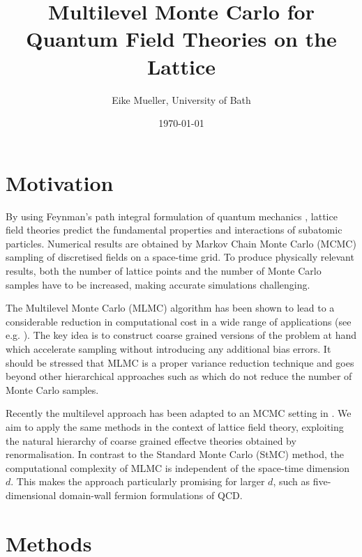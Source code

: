 \documentclass[11pt]{article}
\author{Eike Mueller, University of Bath}
\date{\today}
\title{Multilevel Monte Carlo for Quantum Field Theories on the Lattice}
\begin{document}
\maketitle
\section{Motivation}
By using Feynman's path integral formulation of quantum mechanics \cite{Feynman2010}, lattice field theories predict the fundamental properties and interactions of subatomic particles. Numerical results are obtained by Markov Chain Monte Carlo (MCMC) sampling of discretised fields on a space-time grid. To produce physically relevant results, both the number of lattice points and the number of Monte Carlo samples have to be increased, making accurate simulations challenging.

The Multilevel Monte Carlo (MLMC) algorithm \cite{Heinrich2001,Giles2008,Giles2015} has been shown to lead to a considerable reduction in computational cost in a wide range of applications (see e.g. \cite{Katsiolides2017}). The key idea is to construct coarse grained versions of the problem at hand which accelerate sampling without introducing any additional bias errors. It should be stressed that MLMC is a proper variance reduction technique and goes beyond other hierarchical approaches such as \cite{Faas1986} which do not reduce the number of Monte Carlo samples.

Recently the multilevel approach has been adapted to an MCMC setting in \cite{Dodwell2015}. We aim to apply the same methods in the context of lattice field theory, exploiting the natural hierarchy of coarse grained effectve theories obtained by renormalisation. In contrast to the Standard Monte Carlo (StMC) method, the computational complexity of MLMC is independent of the space-time dimension $d$. This makes the approach particularly promising for larger $d$, such as five-dimensional domain-wall fermion formulations \cite{Kaplan1992} of QCD. 
\section{Methods}

\end{document}
